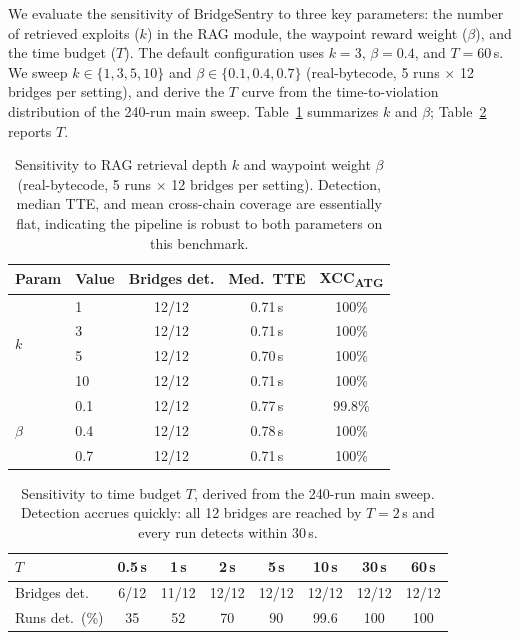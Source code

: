 \documentclass[journal]{IEEEtran}
\begin{document}
We evaluate the sensitivity of BridgeSentry to three key parameters: the number of retrieved exploits ($k$) in the RAG module, the waypoint reward weight ($\beta$), and the time budget ($T$). The default configuration uses $k = 3$, $\beta = 0.4$, and $T = 60$\,s. We sweep $k \in \{1,3,5,10\}$ and $\beta \in \{0.1,0.4,0.7\}$ (real-bytecode, 5 runs $\times$ 12 bridges per setting), and derive the $T$ curve from the time-to-violation distribution of the 240-run main sweep. Table~\ref{tab:sensitivity} summarizes $k$ and $\beta$; Table~\ref{tab:tbudget} reports $T$.

\begin{table}[t]
\centering
\caption{Sensitivity to RAG retrieval depth $k$ and waypoint weight $\beta$ (real-bytecode, 5 runs $\times$ 12 bridges per setting). Detection, median TTE, and mean cross-chain coverage are essentially flat, indicating the pipeline is robust to both parameters on this benchmark.}
\label{tab:sensitivity}
\begin{tabular}{@{}llccc@{}}
\toprule
Param & Value & Bridges det. & Med.\ TTE & XCC\textsubscript{ATG} \\
\midrule
\multirow{4}{*}{$k$}
 & 1  & 12/12 & 0.71\,s & 100\% \\
 & 3  & 12/12 & 0.71\,s & 100\% \\
 & 5  & 12/12 & 0.70\,s & 100\% \\
 & 10 & 12/12 & 0.71\,s & 100\% \\
\midrule
\multirow{3}{*}{$\beta$}
 & 0.1 & 12/12 & 0.77\,s & 99.8\% \\
 & 0.4 & 12/12 & 0.78\,s & 100\% \\
 & 0.7 & 12/12 & 0.71\,s & 100\% \\
\bottomrule
\end{tabular}
\end{table}

\begin{table}[t]
\centering
\caption{Sensitivity to time budget $T$, derived from the 240-run main sweep. Detection accrues quickly: all 12 bridges are reached by $T=2$\,s and every run detects within 30\,s.}
\label{tab:tbudget}
\begin{tabular}{@{}lccccccc@{}}
\toprule
$T$ & 0.5\,s & 1\,s & 2\,s & 5\,s & 10\,s & 30\,s & 60\,s \\
\midrule
Bridges det. & 6/12 & 11/12 & 12/12 & 12/12 & 12/12 & 12/12 & 12/12 \\
Runs det.\ (\%) & 35 & 52 & 70 & 90 & 99.6 & 100 & 100 \\
\bottomrule
\end{tabular}
\end{table}
\end{document}

